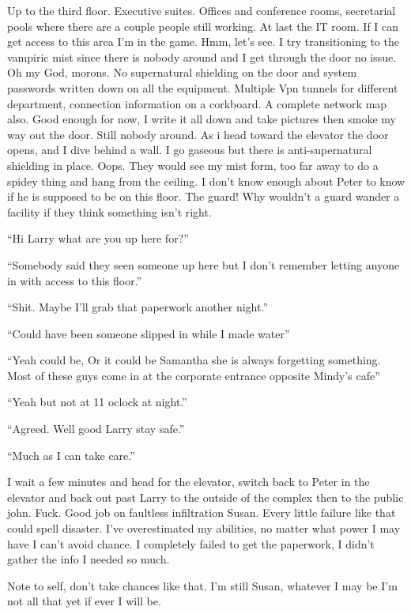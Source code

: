 Up to the third floor. Executive suites. Offices and conference rooms, secretarial pools where there are a couple people still working. At last the IT room. If I can get access to this area I'm in the game. Hmm, let's see. I try transitioning to the vampiric mist since there is nobody around and I get through the door no issue. Oh my God, morons. No supernatural shielding on the door and system passwords written down on all the equipment. Multiple Vpn tunnels for different department, connection information on a corkboard. A complete network map also. Good enough for now, I write it all down and take pictures then smoke my way out the door. Still nobody around. 
As i head toward the elevator the door opens, and I dive behind a wall. I go gaseous but there is anti-supernatural shielding in place. Oops. They would see my mist form, too far away to do a spidey thing and hang from the ceiling. I don't know enough about Peter to know if he is supposed to be on this floor. The guard! Why wouldn't a guard wander a facility if they think something isn't right.

``Hi Larry what are you up here for?''

``Somebody said they seen someone up here but I don't remember letting anyone in with access to this floor.''

``Shit. Maybe I'll grab that paperwork another night.''

``Could have been someone slipped in while I made water''

``Yeah could be, Or it could be Samantha she is always forgetting something. Most of these guys come in at the corporate entrance opposite Mindy's cafe''

``Yeah but not at 11 oclock at night.''

``Agreed. Well good Larry stay safe.''

``Much as I can take care.''

I wait a few minutes and head for the elevator, switch back to Peter in the elevator and back out past Larry to the outside of the complex then to the public john. 
Fuck. Good job on faultless infiltration Susan. Every little failure like that could spell disaster. I've overestimated my abilities, no matter what power I may have I can't avoid chance. I completely failed to get the paperwork, I didn't gather the info I needed so much.

Note to self, don't take chances like that. I'm still Susan, whatever I may be I'm not all that yet if ever I will be.

